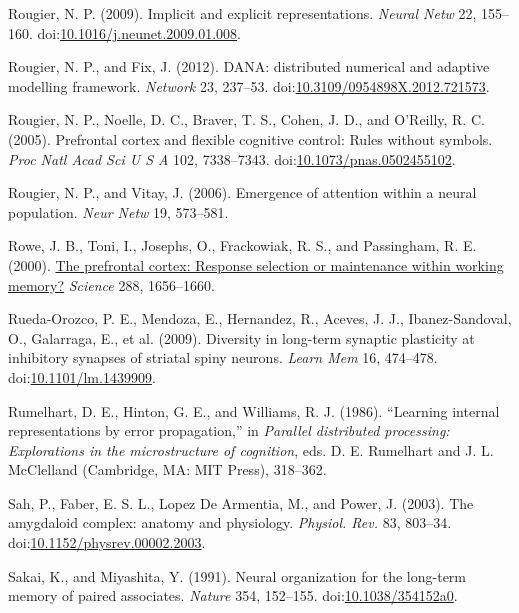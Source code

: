 \documentclass[
  11pt,
  a4paper,
]{scrbook}
\newlength{\cslhangindent}
\newenvironment{CSLReferences}[2] %
 {\begin{list}{}{%
  \setlength{\itemindent}{0pt}
  \setlength{\leftmargin}{0pt}
  \setlength{\parsep}{0pt}
  \ifodd #1
   \setlength{\leftmargin}{\cslhangindent}
   \setlength{\itemindent}{-1\cslhangindent}
  \fi
  \setlength{\itemsep}{#2\baselineskip}}}
 {\end{list}}
\begin{document}
\begin{CSLReferences}{1}{1}
Rougier, N. P. (2009). Implicit and explicit representations.
\emph{Neural Netw} 22, 155--160.
doi:\href{https://doi.org/10.1016/j.neunet.2009.01.008}{10.1016/j.neunet.2009.01.008}.

Rougier, N. P., and Fix, J. (2012). {DANA: distributed numerical and
adaptive modelling framework.} \emph{Network} 23, 237--53.
doi:\href{https://doi.org/10.3109/0954898X.2012.721573}{10.3109/0954898X.2012.721573}.

Rougier, N. P., Noelle, D. C., Braver, T. S., Cohen, J. D., and
O'Reilly, R. C. (2005). Prefrontal cortex and flexible cognitive
control: Rules without symbols. \emph{Proc Natl Acad Sci U S A} 102,
7338--7343.
doi:\href{https://doi.org/10.1073/pnas.0502455102}{10.1073/pnas.0502455102}.

Rougier, N. P., and Vitay, J. (2006). Emergence of attention within a
neural population. \emph{Neur Netw} 19, 573--581.

Rowe, J. B., Toni, I., Josephs, O., Frackowiak, R. S., and Passingham,
R. E. (2000). \href{https://www.ncbi.nlm.nih.gov/pubmed/10834847}{The
prefrontal cortex: Response selection or maintenance within working
memory?} \emph{Science} 288, 1656--1660.

Rueda-Orozco, P. E., Mendoza, E., Hernandez, R., Aceves, J. J.,
Ibanez-Sandoval, O., Galarraga, E., et al. (2009). Diversity in
long-term synaptic plasticity at inhibitory synapses of striatal spiny
neurons. \emph{Learn Mem} 16, 474--478.
doi:\href{https://doi.org/10.1101/lm.1439909}{10.1101/lm.1439909}.

Rumelhart, D. E., Hinton, G. E., and Williams, R. J. (1986). {``Learning
internal representations by error propagation,''} in \emph{Parallel
distributed processing: Explorations in the microstructure of
cognition}, eds. D. E. Rumelhart and J. L. McClelland (Cambridge, MA:
MIT Press), 318--362.

Sah, P., Faber, E. S. L., Lopez De Armentia, M., and Power, J. (2003).
{The amygdaloid complex: anatomy and physiology.} \emph{Physiol. Rev.}
83, 803--34.
doi:\href{https://doi.org/10.1152/physrev.00002.2003}{10.1152/physrev.00002.2003}.

Sakai, K., and Miyashita, Y. (1991). Neural organization for the
long-term memory of paired associates. \emph{Nature} 354, 152--155.
doi:\href{https://doi.org/10.1038/354152a0}{10.1038/354152a0}.


\end{CSLReferences}
\end{document}
